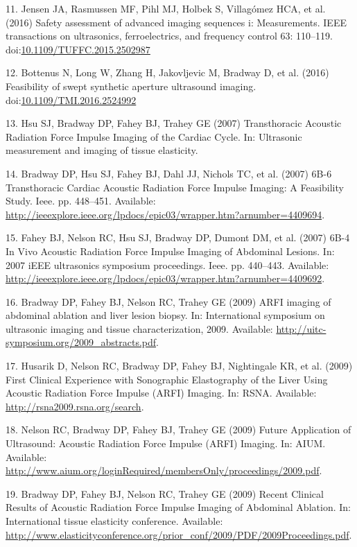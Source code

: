 \documentclass[]{article}
\begin{document}
11. Jensen JA, Rasmussen MF, Pihl MJ, Holbek S, Villag{ó}mez HCA, et al.
(2016) Safety assessment of advanced imaging sequences i: Measurements.
IEEE transactions on ultrasonics, ferroelectrics, and frequency control
63: 110--119.
doi:\href{http://dx.doi.org/10.1109/TUFFC.2015.2502987}{10.1109/TUFFC.2015.2502987}

12. Bottenus N, Long W, Zhang H, Jakovljevic M, Bradway D, et al. (2016)
Feasibility of swept synthetic aperture ultrasound imaging.
doi:\href{http://dx.doi.org/10.1109/TMI.2016.2524992}{10.1109/TMI.2016.2524992}

13. Hsu SJ, Bradway DP, Fahey BJ, Trahey GE (2007) Transthoracic
Acoustic Radiation Force Impulse Imaging of the Cardiac Cycle. In:
Ultrasonic measurement and imaging of tissue elasticity.

14. Bradway DP, Hsu SJ, Fahey BJ, Dahl JJ, Nichols TC, et al. (2007)
6B-6 Transthoracic Cardiac Acoustic Radiation Force Impulse Imaging: A
Feasibility Study. Ieee. pp. 448--451. Available:
\url{http://ieeexplore.ieee.org/lpdocs/epic03/wrapper.htm?arnumber=4409694}.

15. Fahey BJ, Nelson RC, Hsu SJ, Bradway DP, Dumont DM, et al. (2007)
6B-4 In Vivo Acoustic Radiation Force Impulse Imaging of Abdominal
Lesions. In: 2007 iEEE ultrasonics symposium proceedings. Ieee. pp.
440--443. Available:
\url{http://ieeexplore.ieee.org/lpdocs/epic03/wrapper.htm?arnumber=4409692}.

16. Bradway DP, Fahey BJ, Nelson RC, Trahey GE (2009) ARFI imaging of
abdominal ablation and liver lesion biopsy. In: International symposium
on ultrasonic imaging and tissue characterization, 2009. Available:
\url{http://uitc-symposium.org/2009_abstracts.pdf}.

17. Husarik D, Nelson RC, Bradway DP, Fahey BJ, Nightingale KR, et al.
(2009) First Clinical Experience with Sonographic Elastography of the
Liver Using Acoustic Radiation Force Impulse (ARFI) Imaging. In: RSNA.
Available: \url{http://rsna2009.rsna.org/search}.

18. Nelson RC, Bradway DP, Fahey BJ, Trahey GE (2009) Future Application
of Ultrasound: Acoustic Radiation Force Impulse (ARFI) Imaging. In:
AIUM. Available:
\url{http://www.aium.org/loginRequired/membersOnly/proceedings/2009.pdf}.

19. Bradway DP, Fahey BJ, Nelson RC, Trahey GE (2009) Recent Clinical
Results of Acoustic Radiation Force Impulse Imaging of Abdominal
Ablation. In: International tissue elasticity conference. Available:
\url{http://www.elasticityconference.org/prior_conf/2009/PDF/2009Proceedings.pdf}.
\end{document}
